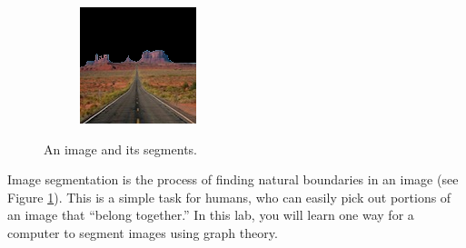 \begin{figure}
\begin{subfigure}{0.31\textwidth}
    \end{subfigure}
    \hspace*{\fill}
    \begin{subfigure}{0.31\textwidth}
        \includegraphics[width=\textwidth]{PosMon.png}
    \end{subfigure}
    
\caption{An image and its segments.}
\label{fig:monument}
\end{figure}
Image segmentation is the process of finding natural boundaries in an image (see Figure \ref{fig:monument}).
This is a simple task for humans, who can easily pick out portions of an image that ``belong together.''
In this lab, you will learn one way for a computer to segment images using graph theory.

